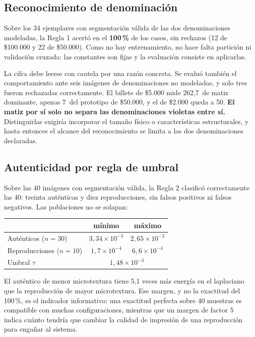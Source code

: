 \documentclass[conference]{IEEEtran}
\begin{document}
\subsection{Reconocimiento de denominación}

Sobre los 34 ejemplares con segmentación válida de las dos
denominaciones modeladas, la Regla 1 acertó en el \textbf{100\,\%} de
los casos, sin rechazos (12 de \$100.000 y 22 de \$50.000). Como no hay
entrenamiento, no hace falta partición ni validación cruzada: las
constantes son fijas y la evaluación consiste en aplicarlas.

La cifra debe leerse con cautela por una razón concreta. Se evaluó
también el comportamiento ante seis imágenes de denominaciones no
modeladas, y solo tres fueron rechazadas correctamente. El billete de
\$5.000 mide 262{,}7\textdegree\ de matiz dominante, apenas
7\textdegree\ del prototipo de \$50.000, y el de \$2.000 queda a
50\textdegree. \textbf{El matiz por sí solo no separa las
denominaciones violetas entre sí.} Distinguirlas exigiría incorporar el
tamaño físico o características estructurales, y hasta entonces el
alcance del reconocimiento se limita a las dos denominaciones
declaradas.

\subsection{Autenticidad por regla de umbral}

Sobre las 40 imágenes con segmentación válida, la Regla 2 clasificó
correctamente las 40: treinta auténticas y diez reproducciones, sin
falsos positivos ni falsos negativos. Las poblaciones no se solapan:

\begin{center}
\small
\begin{tabular}{@{}lcc@{}}
\toprule
 & \textbf{mínimo} & \textbf{máximo} \\
\midrule
Auténticos ($n=30$)     & $3{,}34\times10^{-3}$ & $2{,}65\times10^{-2}$ \\
Reproducciones ($n=10$) & $1{,}7\times10^{-4}$  & $6{,}6\times10^{-4}$ \\
\midrule
Umbral $\tau$           & \multicolumn{2}{c}{$1{,}48\times10^{-3}$} \\
\bottomrule
\end{tabular}
\end{center}

El auténtico de menor microtextura tiene 5{,}1 veces más energía en el
laplaciano que la reproducción de mayor microtextura. Ese margen, y no
la exactitud del 100\,\%, es el indicador informativo: una exactitud
perfecta sobre 40 muestras es compatible con muchas configuraciones,
mientras que un margen de factor 5 indica cuánto tendría que cambiar la
calidad de impresión de una reproducción para engañar al sistema.
\end{document}
